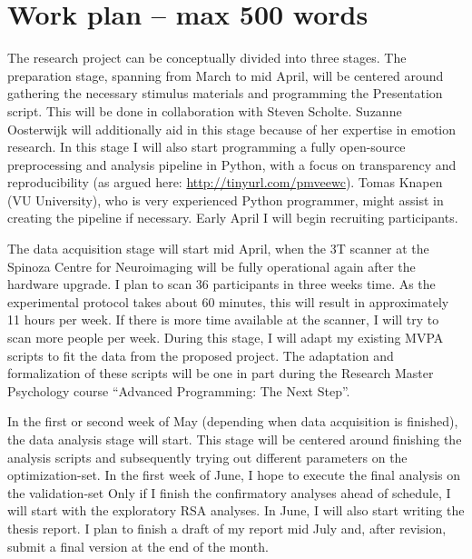 \documentclass[12pt,a4paper]{article}\usepackage[]{graphicx}\usepackage[]{color}
\begin{document}
\noindent
\wordcount

\section{Work plan \textmd{– max 500 words}}
The research project can be conceptually divided into three stages. The preparation stage, spanning from March to mid April, will be centered around gathering the necessary stimulus materials and programming the Presentation script. This will be done in collaboration with Steven Scholte. Suzanne Oosterwijk will additionally aid in this stage because of her expertise in emotion research. In this stage I will also start programming a fully open-source preprocessing and analysis pipeline in Python, with a focus on transparency and reproducibility (as argued here: \url{http://tinyurl.com/pmveewc}). Tomas Knapen (VU University), who is very experienced Python programmer, might assist in creating the pipeline if necessary. Early April I will begin recruiting participants. 

The data acquisition stage will start mid April, when the 3T scanner at the Spinoza Centre for Neuroimaging will be fully operational again after the hardware upgrade. I plan to scan 36 participants in three weeks time. As the experimental protocol takes about 60 minutes, this will result in approximately 11 hours per week. If there is more time available at the scanner, I will try to scan more people per week. During this stage, I will adapt my existing MVPA scripts to fit the data from the proposed project. The adaptation and formalization of these scripts will be one in part during the Research Master Psychology course ``Advanced Programming: The Next Step''.

In the first or second week of May (depending when data acquisition is finished), the data analysis stage will start. This stage will be centered around finishing the analysis scripts and subsequently trying out different parameters on the optimization-set. In the first week of June, I hope to execute the final analysis on the validation-set Only if I finish the confirmatory analyses ahead of schedule, I will start with the exploratory RSA analyses. In June, I will also start writing the thesis report. I plan to finish a draft of my report mid July and, after revision, submit a final version at the end of the month.
\end{document}
